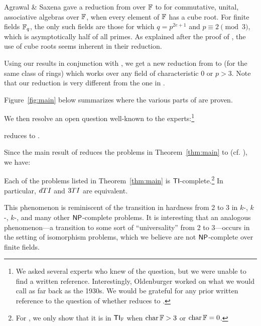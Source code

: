 \begin{remark}
Agrawal \& Saxena \cite[Thm.~5]{AS05} gave a reduction from \CubicFormlong over $\mathbb{F}$ to  for commutative, unital, associative algebras over $\mathbb{F}$, when every element of $\mathbb{F}$ has a cube root. 
For finite fields $\mathbb{F}_q$, the 
only such fields are those for which $q=p^{2e+1}$ and $p\equiv 2 \pmod{3}$, which 
is asymptotically half of all primes. As explained after the proof of 
\cite[Thm.~5]{AS05}, the use of cube roots
seems inherent in their reduction.

Using our results in conjunction with \cite{FGS19}, we get a new reduction from 
\CubicFormlong to  
(for the same class of rings) which works over 
any field of characteristic 0 or $p > 3$. 
Note that our reduction is very different from the one in 
\cite{AS05}.
\end{remark}

Figure~\ref{fig:main} below summarizes where the various parts of  are proven.

We then resolve an open question well-known to the experts:\footnote{We asked several experts who knew of the question, but we were unable to find a written reference. Interestingly, Oldenburger \cite{oldenburger} worked on what we would call \DeeTIlong as far back as the 1930s. We would be grateful for any prior written reference to the question of whether \DeeTI reduces to \ThreeTI.}

\begin{maintheorem} \label{thm:d_to_3}
\DeeTIlong reduces to \AlgIsolong.
\end{maintheorem}

Since the main result of \cite{FGS19} reduces the problems in Theorem~\ref{thm:main} to 
\ThreeTIlong (cf. \cite[Rmk.~1.1]{FGS19}), we have:

\begin{maincorollary} \label{cor:main}
Each of the problems listed in Theorem~\ref{thm:main} is $\mathsf{TI}$-complete.\footnote{For \CubicFormlong, we only show that it is in $\mathsf{TI}_{\mathbb{F}}$ when $\operatorname{char} 
 \mathbb{F} > 3$ or $\operatorname{char} \mathbb{F} = 0$.}
In particular, $d{\sc TI}$ and ${\sc 3TI}$ are equivalent.
\end{maincorollary}

\begin{remark}
This phenomenon is reminiscent of the transition in hardness from 2 to 3 in 
$k$-, $k$-, $k$-, and many 
other $\mathsf{NP}$-complete problems. It is interesting that an analogous 
phenomenon---a transition to some sort of ``universality'' from 2 to 3---occurs in 
the setting of isomorphism problems, which we believe are not $\mathsf{NP}$-complete 
 over finite fields.
\end{remark}

